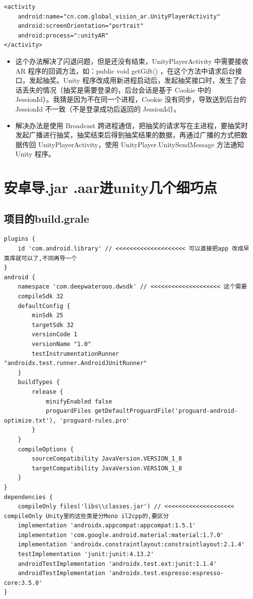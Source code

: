 \documentclass[9pt, b5paper]{article}
\begin{document}
\begin{verbatim}
<activity
    android:name="cn.com.global_vision_ar.UnityPlayerActivity"
    android:screenOrientation="portrait"
    android:process=":unityAR"
</activity>
\end{verbatim}
\begin{itemize}
\item 这个办法解决了闪退问题，但是还没有结束，UnityPlayerActivity 中需要接收 AR 程序的回调方法，如：public void getGift() ，在这个方法中请求后台接口，发起抽奖。Unity 程序改成用新进程启动后，发起抽奖接口时，发生了会话丢失的情况（抽奖是需要登录的，后台会话是基于 Cookie 中的 JessionId）。我猜是因为不在同一个进程，Cookie 没有同步，导致送到后台的 JessionId 不一致（不是登录成功后返回的 JessionId）。
\item 解决办法是使用 Broadcast 跨进程通信，把抽奖的请求写在主进程，要抽奖时发起广播进行抽奖，抽奖结束后得到抽奖结果的数据，再通过广播的方式把数据传回 UnityPlayerActivity，使用 UnityPlayer.UnitySendMessage 方法通知 Unity 程序。
\end{itemize}

\section{安卓导.jar .aar进unity几个细巧点}
\label{sec-2}
\subsection{项目的build.grale}
\label{sec-2-1}
\begin{verbatim}
plugins {
    id 'com.android.library' // <<<<<<<<<<<<<<<<<<<< 可以直接把app 改成早类库就可以了,不同再导一个
}
android {
    namespace 'com.deepwaterooo.dwsdk' // <<<<<<<<<<<<<<<<<<<< 这个需要
    compileSdk 32
    defaultConfig {
        minSdk 25
        targetSdk 32
        versionCode 1
        versionName "1.0"
        testInstrumentationRunner "androidx.test.runner.AndroidJUnitRunner"
    }
    buildTypes {
        release {
            minifyEnabled false
            proguardFiles getDefaultProguardFile('proguard-android-optimize.txt'), 'proguard-rules.pro'
        }
    }
    compileOptions {
        sourceCompatibility JavaVersion.VERSION_1_8
        targetCompatibility JavaVersion.VERSION_1_8
    }
}
dependencies {
    compileOnly files('libs\\classes.jar') // <<<<<<<<<<<<<<<<<<<< compileOnly Unity里的这些类是分Mono il2cpp的,要区分
    implementation 'androidx.appcompat:appcompat:1.5.1'
    implementation 'com.google.android.material:material:1.7.0'
    implementation 'androidx.constraintlayout:constraintlayout:2.1.4'
    testImplementation 'junit:junit:4.13.2'
    androidTestImplementation 'androidx.test.ext:junit:1.1.4'
    androidTestImplementation 'androidx.test.espresso:espresso-core:3.5.0'
}
\end{verbatim}
\end{document}
